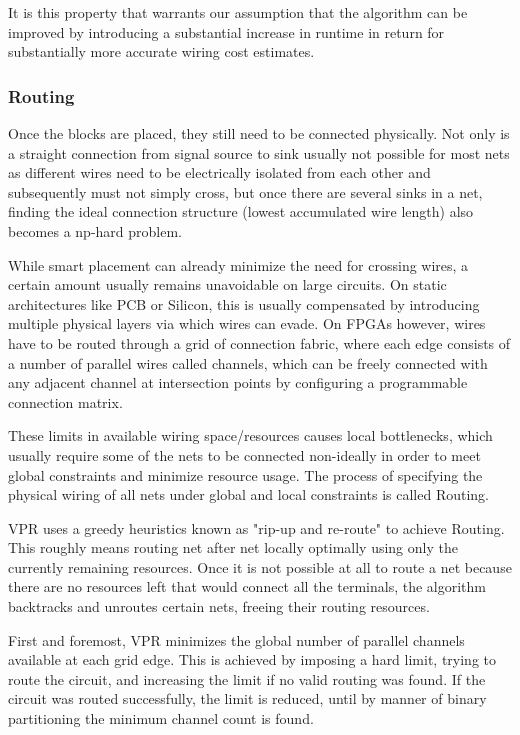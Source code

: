 It is this property that warrants our assumption that the algorithm can be improved by introducing a substantial increase in runtime in return for substantially more accurate wiring cost estimates.

\subsubsection{Routing}

Once the blocks are placed, they still need to be connected physically. Not only is a straight connection from signal source to sink usually not possible for most nets as different wires need to be electrically isolated from each other and subsequently must not simply cross, but once there are several sinks in a net, finding the ideal connection structure (lowest accumulated wire length) also becomes a np-hard problem\cite{TODO}.

While smart placement can already minimize the need for crossing wires, a certain amount usually remains unavoidable on large circuits. On static architectures like \gls{PCB} or Silicon, this is usually compensated by introducing multiple physical layers via which wires can evade. On \glspl{FPGA} however, wires have to be routed through a grid of connection fabric, where each edge consists of a number of parallel wires called channels, which can be freely connected with any adjacent channel at intersection points by configuring a programmable connection matrix.

These limits in available wiring space/resources causes local bottlenecks, which usually require some of the nets to be connected non-ideally in order to meet global constraints and minimize resource usage. The process of specifying the physical wiring of all nets under global and local constraints is called Routing.

\gls{VPR} uses a greedy heuristics known as "rip-up and re-route" to achieve Routing.\cite{TODO} This roughly means routing net after net locally optimally using only the currently remaining resources. Once it is not possible at all to route a net because there are no resources left that would connect all the terminals, the algorithm backtracks and unroutes certain nets, freeing their routing resources.

First and foremost, \gls{VPR} minimizes the global number of parallel channels available at each grid edge. This is achieved by imposing a hard limit, trying to route the circuit, and increasing the limit if no valid routing was found. If the circuit was routed successfully, the limit is reduced, until by manner of binary partitioning the minimum channel count is found.

